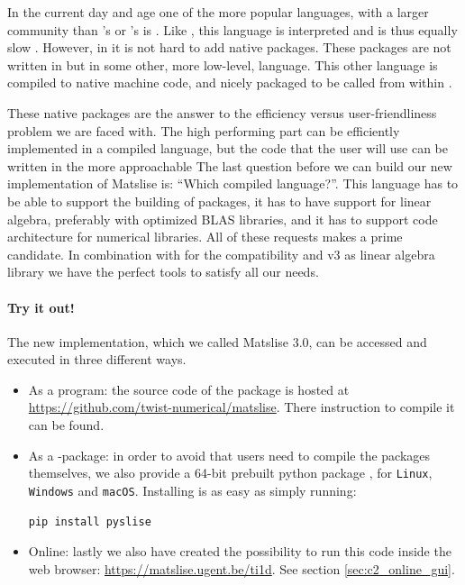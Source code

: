 In the current day and age one of the more popular languages, with a larger community than \fortran{}'s or \matlab{}'s is \lpython{}. Like \matlab{}, this language is interpreted and is thus equally slow \cite{chaves_octave_2006,unpingco_comparative_2008}. However, in \lpython{} it is not hard to add native packages. These packages are not written in \lpython{} but in some other, more low-level, language. This other language is compiled to native machine code, and nicely packaged to be called from within \lpython{}.

These native packages are the answer to the efficiency versus user-friendliness problem we are faced with. The high performing part can be efficiently implemented in a compiled language, but the code that the user will use can be written in the more approachable \lpython{} The last question before we can build our new implementation of Matslise is: ``Which compiled language?''. This language has to be able to support the building of \lpython{} packages, it has to have support for linear algebra, preferably with optimized BLAS libraries, and it has to support code architecture for numerical libraries. All of these requests makes \cpp a prime candidate. In combination with \pybind \cite{jakob_pybind11_2017} for the \lpython compatibility and \Eigen v3 \cite{guennebaud_eigen_2010} as linear algebra library we have the perfect tools to satisfy all our needs.

\paragraph{Try it out!} The new implementation, which we called Matslise 3.0, can be accessed and executed in three different ways.

\begin{itemize}
    \item As a \cpp program: the source code of the package is hosted at \url{https://github.com/twist-numerical/matslise}. There instruction to compile it can be found.
    \item As a \lpython{}-package: in order to avoid that users need to compile the packages themselves, we also provide a 64-bit prebuilt python package \pyslise{}, for \texttt{Linux}, \texttt{Windows} and \texttt{macOS}. Installing \pyslise{} is as easy as simply running:
\begin{verbatim}
pip install pyslise
\end{verbatim}
    \item Online: lastly we also have created the possibility to run this code inside the web browser: \url{https://matslise.ugent.be/ti1d}. See section \ref{sec:c2_online_gui}.
\end{itemize}

